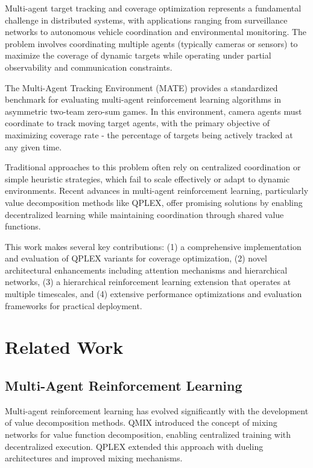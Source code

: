 \documentclass[conference]{IEEEtran}
\begin{document}
Multi-agent target tracking and coverage optimization represents a fundamental challenge in distributed systems, with applications ranging from surveillance networks to autonomous vehicle coordination and environmental monitoring. The problem involves coordinating multiple agents (typically cameras or sensors) to maximize the coverage of dynamic targets while operating under partial observability and communication constraints.

The Multi-Agent Tracking Environment (MATE) provides a standardized benchmark for evaluating multi-agent reinforcement learning algorithms in asymmetric two-team zero-sum games. In this environment, camera agents must coordinate to track moving target agents, with the primary objective of maximizing coverage rate - the percentage of targets being actively tracked at any given time.

Traditional approaches to this problem often rely on centralized coordination or simple heuristic strategies, which fail to scale effectively or adapt to dynamic environments. Recent advances in multi-agent reinforcement learning, particularly value decomposition methods like QPLEX, offer promising solutions by enabling decentralized learning while maintaining coordination through shared value functions.

This work makes several key contributions: (1) a comprehensive implementation and evaluation of QPLEX variants for coverage optimization, (2) novel architectural enhancements including attention mechanisms and hierarchical networks, (3) a hierarchical reinforcement learning extension that operates at multiple timescales, and (4) extensive performance optimizations and evaluation frameworks for practical deployment.

\section{Related Work}

\subsection{Multi-Agent Reinforcement Learning}
Multi-agent reinforcement learning has evolved significantly with the development of value decomposition methods. QMIX \cite{rashid2018qmix} introduced the concept of mixing networks for value function decomposition, enabling centralized training with decentralized execution. QPLEX \cite{wang2020qplex} extended this approach with dueling architectures and improved mixing mechanisms.
\end{document}
